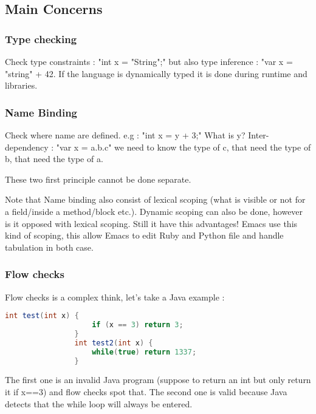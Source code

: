     \subsection{Main Concerns}
        \subsubsection{Type checking}
            \theoremstyle{definition}
            \begin{definition}
                Check type constraints : "int x = "String";" but also type
                inference : "var x = "string" + 42.
                If the language is dynamically typed it is done during runtime and libraries.
            \end{definition}

        \subsubsection{Name Binding}
            \theoremstyle{definition}
            \begin{definition}
                Check where name are defined. e.g : "int x = y + 3;" What is y?
                Inter-dependency : "var x = a.b.c" we need to know the type of
                c, that need the type of b, that need the type of a.
            \end{definition}
            These two first principle cannot be done separate.

            Note that Name binding also consist of lexical scoping (what is
            visible or not for a field/inside a method/block etc.). Dynamic
            scoping can also be done, however is it opposed with lexical
            scoping. Still it have this advantages! Emacs use this kind of
            scoping, this allow Emacs to edit Ruby and Python file and handle
            tabulation in both case.
        \subsubsection{Flow checks}
            Flow checks is a complex think, let's take a Java example : 
            \begin{lstlisting}[language=Java,label={lst:flow_check}]
                int test(int x) {
                    if (x == 3) return 3;
                }
                int test2(int x) {
                    while(true) return 1337;
                }
            \end{lstlisting}
            The first one is an invalid Java program (suppose to return an int
            but only return it if x==3) and flow checks spot that. The second
            one is valid because Java detects that the while loop will always be
            entered.
